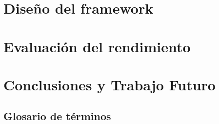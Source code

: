 \documentclass[12pt,spanish]{book}
\begin{document}



\chapter{Diseño del framework}\label{cap:Diseño}


\chapter{Evaluación del rendimiento}\label{cap:Rend}


\chapter{Conclusiones y Trabajo Futuro}




\appendixpage
{}
\begin{appendices}
\section{Glosario de términos}

\end{appendices}






\end{document}
